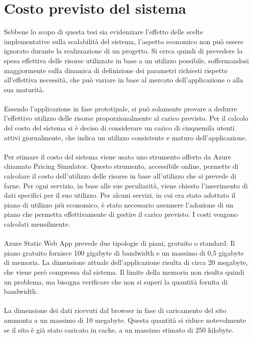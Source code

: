 \section{Costo previsto del sistema}
Sebbene lo scopo di questa tesi sia evidenziare
l'effetto delle scelte implementative sulla scalabilità del sistema,
l'aspetto economico non può essere ignorato durante la realizzazione di un progetto.
Si cerca quindi di prevedere la spesa effettiva delle risorse utilizzate in base a un utilizzo possibile,
soffermandosi maggiormente sulla dinamica di definizione dei parametri richiesti 
rispetto all'effettiva necessità, 
che può variare in base al mercato dell'applicazione o alla sua maturità.\\
\\
Essendo l'applicazione in fase prototipale, 
si può solamente provare a dedurre l'effettivo utilizzo delle risorse proporzionalmente al carico previsto.
Per il calcolo del costo del sistema si è deciso di considerare un carico 
di cinquemila utenti attivi giornalmente, 
che indica un utilizzo consistente e maturo dell'applicazione.\\
\\
Per stimare il costo del sistema viene usato uno strumento offerto da Azure chiamato Pricing Simulator.
Questo strumento, accessibile online, 
permette di calcolare il costo dell'utilizzo delle risorse in base all'utilizzo che si prevede di farne.
Per ogni servizio, in base alle sue peculiarità, 
viene chiesto l'inserimento di dati specifici per il suo utilizzo.
Per alcuni servizi, in cui era stato adottato il piano di utilizzo più economico, 
è stato necessario assumere l'adozione di un piano 
che permetta effettivamente di gestire il carico previsto.
I costi vengono calcolati mensilmente.\\
\\
Azure Static Web App prevede due tipologie di piani, gratuito o standard.
Il piano gratuito fornisce 100 gigabyte di bandwidth e 
un massimo di 0,5 gigabyte di memoria.
La dimensione attuale dell'applicazione risulta di circa 20 megabyte,
che viene però compressa dal sistema.
Il limite della memoria non risulta quindi un problema,
ma bisogna verificare che non si superi la quantità fornita di bandwidth.\\
\\
La dimensione dei dati ricevuti dal browser in fase di caricamento del sito 
ammonta a un massimo di 10 megabyte.
Questa quantità si riduce notevolmente se il sito è già stato caricato in cache, 
a un massimo stimato di 250 kilobyte.
